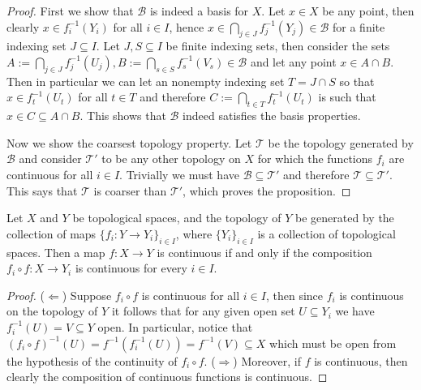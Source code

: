 \begin{proof}
  First we show that \(\mathcal B\) is indeed a basis for \(X\). Let \(x \in X\) 
  be any point, then clearly \(x \in f_i^{-1}(Y_i)\) for all \(i \in I\), hence
  \(x \in \bigcap_{j \in  J} f_j^{-1}(Y_j) \in \mathcal B\) for a finite
  indexing set \(J \subseteq I\).
  Let \(J, S \subseteq I\) be finite indexing sets, then consider the sets
  \(A := \bigcap_{j \in J} f_j^{-1}(U_j), B := \bigcap_{s \in S} f_s^{-1}(V_s) \in
  \mathcal B\) and let any point \(x \in A \cap B\). Then in particular we can
  let an nonempty indexing set \(T = J \cap S\) so that \(x \in f_t^{-1}(U_t)\)
  for all \(t \in T\) and therefore \(C := \bigcap_{t \in  T} f_t^{-1}(U_t)\) is
  such that \(x \in C \subseteq A \cap B\). This shows that \(\mathcal B\) 
  indeed satisfies the basis properties.

  Now we show the coarsest topology property. Let \(\mathcal T\) be the topology
  generated by \(\mathcal B\) and consider \(\mathcal T'\) to be any other
  topology on \(X\) for which the functions \(f_i\) are continuous for all \(i
  \in I\). Trivially we must have \(\mathcal B \subseteq \mathcal T'\) and
  therefore \(\mathcal T \subseteq \mathcal T'\). This says that \(\mathcal T\) 
  is coarser than \(\mathcal T'\), which proves the proposition.
\end{proof}

\begin{proposition}
  Let \(X\) and \(Y\) be topological spaces, and the topology of \(Y\) be
  generated by the collection of maps \(\{f_i : Y \to Y_i\}_{i \in I}\), where
  \(\{Y_i\}_{i \in I}\) is a collection of topological spaces. Then a map \(f :
  X \to Y\) is continuous if and only if the composition \(f_i \circ f : X \to
  Y_i\) is continuous for every \(i \in I\).
\end{proposition}

\begin{proof}
  (\(\Leftarrow\)) Suppose \(f_i \circ f\) is continuous for all \(i \in I\),
  then since \(f_i\) is continuous on the topology of \(Y\) it follows that for
  any given open set \(U \subseteq Y_i\) we have \(f_i^{-1}(U) = V \subseteq Y\)
  open. In particular, notice that \((f_i \circ f)^{-1}(U) = f^{-1}(f_i^{-1}(U))
  = f^{-1}(V) \subseteq X\) which must be open from the hypothesis of the
  continuity of \(f_i \circ f\). (\(\Rightarrow\)) Moreover, if \(f\) is
  continuous, then clearly the composition of continuous functions is
  continuous.
\end{proof}
